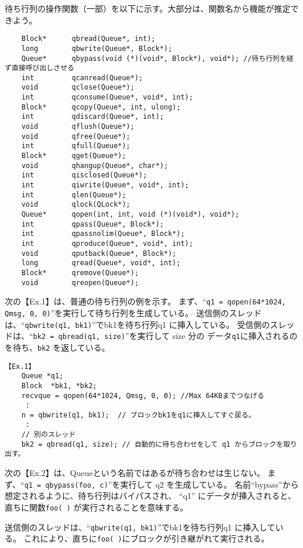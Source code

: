 待ち行列の操作関数（一部）を以下に示す。大部分は、関数名から機能が推定できよう。

{\small
\begin{verbatim}
    Block*      qbread(Queue*, int);
    long        qbwrite(Queue*, Block*);
    Queue*      qbypass(void (*)(void*, Block*), void*); //待ち行列を経ず直接呼び出しさせる
    int         qcanread(Queue*);
    void        qclose(Queue*);
    int         qconsume(Queue*, void*, int);
    Block*      qcopy(Queue*, int, ulong);
    int         qdiscard(Queue*, int);
    void        qflush(Queue*);
    void        qfree(Queue*);
    int         qfull(Queue*);
    Block*      qget(Queue*);
    void        qhangup(Queue*, char*);
    int         qisclosed(Queue*);
    int         qiwrite(Queue*, void*, int);
    int         qlen(Queue*);
    void        qlock(QLock*);
    Queue*      qopen(int, int, void (*)(void*), void*);
    int         qpass(Queue*, Block*);
    int         qpassnolim(Queue*, Block*);
    int         qproduce(Queue*, void*, int);
    void        qputback(Queue*, Block*);
    long        qread(Queue*, void*, int);
    Block*      qremove(Queue*);
    void        qreopen(Queue*);

\end{verbatim}
}



次の【Ex.1】は、普通の待ち行列の例を示す。
まず、``\verb|q1 = qopen(64*1024, Qmsg, 0, 0)|''を実行して待ち行列を生成している。
送信側のスレッドは、``\verb|qbwrite(q1, bk1)|''でbk1を待ち行列q1 に挿入している。
受信側のスレッドは、``\verb|bk2 = qbread(q1, size)|''を実行して size 分の
データ{\tt q1}に挿入されるのを待ち、{\tt bk2} を返している。


{\small
\begin{verbatim}
【Ex.1】
    Queue *q1;
    Block  *bk1, *bk2;
    recvque = qopen(64*1024, Qmsg, 0, 0); //Max 64KBまでつなげる
     :
    n = qbwrite(q1, bk1);  // ブロックbk1をq1に挿入してすぐ戻る。
     :
    // 別のスレッド
    bk2 = qbread(q1, size); // 自動的に待ち合わせをして q1 からブロックを取り出す。

\end{verbatim}
}


次の【Ex.2】は、Queueという名前ではあるが待ち合わせは生じない。
まず、``\verb|q1 = qbypass(foo, c)|''を実行して q2 を生成している。
名前``bypass''から想定されるように、待ち行列はバイパスされ、
``q1'' にデータが挿入されると、直ちに関数\verb|foo( )| が実行されることを意味する。 

送信側のスレッドは、``\verb|qbwrite(q1, bk1)|''でbk1を待ち行列q1 に挿入している。
これにより、直ちに\verb|foo( )|にブロックが引き継がれて実行される。

